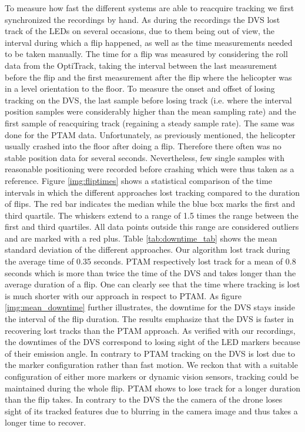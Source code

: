 To measure how fast the different systems are able to reacquire tracking we first synchronized the recordings by hand. As during the recordings the DVS lost track of the LEDs on several occasions, due to them being out of view, the interval during which a flip happened, as well as the time measurements needed to be taken manually. The time for a flip was measured by considering the roll data from the OptiTrack, taking the interval between the last measurement before the flip and the first measurement after the flip where the helicopter was in a level orientation to the floor. To measure the onset and offset of losing tracking on the DVS, the last sample before losing track (i.e.  where the interval position samples were considerably higher than the mean sampling rate) and the first sample of reacquiring track (regaining a steady sample rate).  The same was done for the PTAM data. Unfortunately, as previously mentioned, the helicopter usually crashed into the floor after doing a flip. Therefore there often was no stable position data for several seconds. Nevertheless, few single samples with reasonable positioning were recorded before crashing which were thus taken as a reference. Figure \ref{img:fliptimes} shows a statistical comparison of the time intervals in which the different approaches lost tracking compared to the duration of flips. The red bar indicates the median while the blue box marks the first and third quartile. The whiskers extend to a range of 1.5 times the range between the first and third quartiles. All data points outside this range are considered outliers and are marked with a red plus. 
Table \ref{tab:downtime_tab} shows the mean standard deviation of the different approaches. Our algorithm lost track during the average time of 0.35 seconds. PTAM respectively lost track for a mean of 0.8 seconds which is more than twice the time of the DVS and takes longer than the average duration of a flip. One can clearly see that the time where tracking is lost is much shorter with our approach in respect to PTAM. As figure \ref{img:mean_downtime} further illustrates, the downtime for the DVS stays inside the interval of the flip duration. The results emphasize that the DVS is faster in recovering lost tracks than the PTAM approach. As verified with our recordings, the downtimes  of the DVS correspond to losing sight of the LED markers because of their emission angle. In contrary to PTAM tracking on the DVS is lost due to the marker configuration rather than fast motion. We reckon that with a suitable configuration of either more markers or dynamic vision sensors, tracking could be maintained during the whole flip. PTAM shows to lose track for a longer duration than the flip takes. In contrary to the DVS the the camera of the drone loses sight of its tracked features due to blurring in the camera image and thus takes a longer time to recover.

